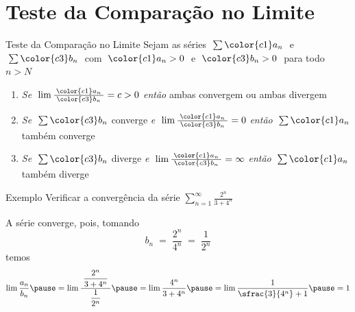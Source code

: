 \section{Teste da Comparação no Limite}

\begin{frame}{Teste da Comparação no Limite}
  Sejam as séries
  \(\; \sum {\color{c1} a_n} \;\) e
  \(\; \sum {\color{c3} b_n} \;\)
  com $\;{\color{c1} a_n} > 0\;$ e $\;{\color{c3} b_n}>0\;$ para todo $n>N$
  \pause
  \vspace{\baselineskip}
  \begin{enumerate}
    \item
    \emph{Se} \(\;\lim \frac{\;{\color{c1} a_n}\;}{{\color{c3} b_n}} = c > 0 \) \;\;
    \emph{então}\; ambas convergem ou ambas divergem

    \pause
    \vfill
    \item
    \emph{Se} \(\;\sum {\color{c3} b_n}\) converge
    \tabto{36mm} \emph{e} \(\;\lim \frac{\;{\color{c1} a_n}\;}{{\color{c3} b_n}} = 0\)
    \tabto{66mm} \emph{então} \(\;\sum {\color{c1} a_n} \) também converge

    \pause
    \vfill
    \item
    \emph{Se} \(\;\sum {\color{c3} b_n}\) diverge
    \tabto{36mm} \emph{e} \(\;\lim \frac{\;{\color{c1} a_n}\;}{{\color{c3} b_n}} = \infty\)
    \tabto{66mm} \emph{então} \(\;\sum {\color{c1} a_n} \) também diverge

    \vfill
  \end{enumerate}
\end{frame}

\addtocounter{exemplo}{1}
\begin{frame}{Exemplo \theexemplo}
  Verificar a convergência da série
  \(
    \sum_{n=1}^\infty \frac{2^n}{3+4^n}
  \)

  \pause
  \vspace{\baselineskip}
  A série converge\pause, pois, tomando
  \[
    b_n
    \;=\; \frac{2^n}{4^n}
    \;=\; \frac{1}{2^n}
  \]
  \pause
  temos
  \[
    \lim \frac{a_n}{b_n}
    \pause
    = \lim \frac{\;\dfrac{2^n}{3+4^n}\;}{\dfrac{1}{2^n}}
    \pause
    = \lim \frac{4^n}{3+4^n}
    \pause
    = \lim \frac{1}{\sfrac{3}{4^n}+1}
    \pause
    = 1
  \]
\end{frame}

